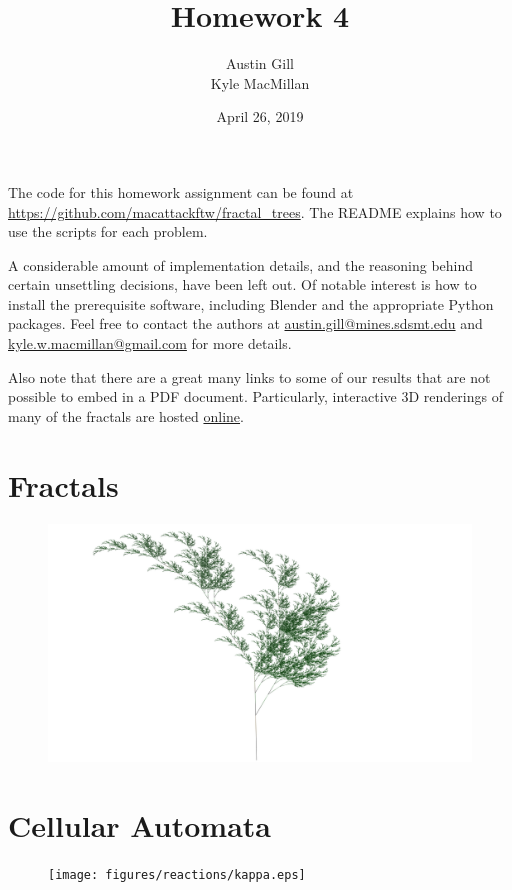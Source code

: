 \documentclass[12pt]{article}
\title{Homework 4}
\author{Austin Gill \\ Kyle MacMillan}
\date{April 26, 2019}
\begin{document}
\maketitle
\begingroup
\hypersetup{linkcolor=black}
\tableofcontents
\endgroup

The code for this homework assignment can be found at \url{https://github.com/macattackftw/fractal_trees}.
The README explains how to use the scripts for each problem.

A considerable amount of implementation details, and the reasoning behind certain unsettling decisions, have been left out.
Of notable interest is how to install the prerequisite software, including Blender and the appropriate Python packages.
Feel free to contact the authors at \href{mailto:austin.gill@mines.sdsmt.edu}{austin.gill@mines.sdsmt.edu} and \href{mailto:kyle.w.macmillan@gmail.com}{kyle.w.macmillan@gmail.com} for more details.

Also note that there are a great many links to some of our results that are not possible to embed in a PDF document.
Particularly, interactive 3D renderings of many of the fractals are hosted \href{https://sketchfab.com/macattackftw/models}{online}.

\newpage

\part{Fractals}
\vspace{2in}
\begin{figure}[H]
    \centering
    \includegraphics[width=\textwidth]{figures/L-systems/a.png}
\end{figure}




\part{Cellular Automata}
\begin{figure}[H]
    \centering
    \texttt{[image: figures/reactions/kappa.eps]}
\end{figure}


\end{document}
